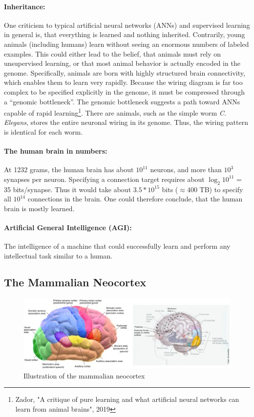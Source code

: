 \documentclass[main]{subfiles}
\begin{document}
\paragraph{Inheritance:} One criticism to typical artificial neural networks (ANNs) and supervised learning in general is, that everything is learned and nothing inherited. Contrarily, young animals (including humans) learn without seeing an enormous numbers of labeled examples. This could either lead to the belief, that animals must rely on unsupervised learning, or that most animal behavior is actually encoded in the genome. Specifically, animals are born with highly structured brain connectivity, which enables them to learn very rapidly. Because the wiring diagram is far too complex to be specified explicitly in the genome, it must be compressed through a “genomic bottleneck”. The genomic bottleneck suggests a path toward ANNs capable of rapid learning\footnote{Zador, "A critique of pure learning and what artificial neural networks can learn from animal brains", 2019}. There are animals, such as the simple worm \textit{C. Elegans}, stores the entire neuronal wiring in its genome. Thus, the wiring pattern is identical for each worm. 

\paragraph{The human brain in numbers:} At 1232 grams, the human brain has about $10^{11}$ neurons, and more than $10^3$ synapses per neuron. Specifying a connection target requires about $\log_2 10^{11}$ = 35 bits/synapse. Thus it would take about $3.5 * 10^{15}$ bits ($\approx 400$ TB) to specify all $10^{14}$ connections in the brain. One could therefore conclude, that the human brain is mostly learned.

\paragraph{Artificial General Intelligence (AGI):} The intelligence of a machine that could successfully learn and perform any intellectual task similar to a human.

\newpage
\subsection{The Mammalian Neocortex}
\begin{figure}[h]
    \centering
    \includegraphics[width=0.99\linewidth]{01_Introduction/figures/neocortex.png}
    \caption{Illustration of the mammalian neocortex}
    \label{fig:basalandcerebellum}
\end{figure}
\end{document}
